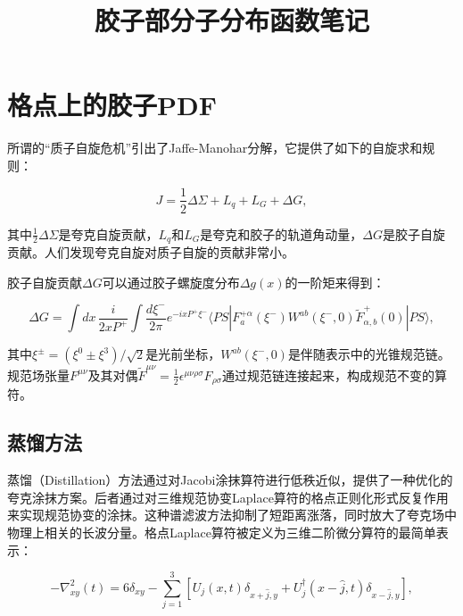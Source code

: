 \documentclass[12pt,a4paper]{ctexart}
\title{\heiti 胶子部分子分布函数笔记}
\author{}
\date{}
\theoremstyle{definition}
\begin{document}
\maketitle

\tableofcontents
\newpage

\section{格点上的胶子PDF}

所谓的``质子自旋危机''引出了Jaffe-Manohar分解\cite{Jaffe1990}，它提供了如下的自旋求和规则：

\begin{equation}
J = \frac{1}{2}\Delta\Sigma + L_q + L_G + \Delta G,
\label{eq:spin_sum}
\end{equation}

其中$\frac{1}{2}\Delta\Sigma$是夸克自旋贡献，$L_q$和$L_G$是夸克和胶子的轨道角动量，$\Delta G$是胶子自旋贡献。人们发现夸克自旋对质子自旋的贡献非常小。

胶子自旋贡献$\Delta G$可以通过胶子螺旋度分布$\Delta g(x)$的一阶矩来得到：

\begin{equation}
\Delta G = \int dx\, \frac{i}{2xP^+} \int \frac{d\xi^-}{2\pi} e^{-ixP^+\xi^-} \langle PS| F^{+\alpha}_a(\xi^-) W^{ab}(\xi^-, 0) \tilde{F}^+_{\alpha,b}(0) |PS\rangle,
\label{eq:DeltaG}
\end{equation}

其中$\xi^\pm = (\xi^0 \pm \xi^3)/\sqrt{2}$是光前坐标，$W^{ab}(\xi^-, 0)$是伴随表示中的光锥规范链。规范场张量$F^{\mu\nu}$及其对偶$\tilde{F}^{\mu\nu} = \frac{1}{2}\epsilon^{\mu\nu\rho\sigma}F_{\rho\sigma}$通过规范链连接起来，构成规范不变的算符。

\subsection{蒸馏方法}

蒸馏（Distillation）方法\cite{Peardon2009}通过对Jacobi涂抹算符\cite{Allton1993}进行低秩近似，提供了一种优化的夸克涂抹方案。后者通过对三维规范协变Laplace算符的格点正则化形式反复作用来实现规范协变的涂抹。这种谱滤波方法抑制了短距离涨落，同时放大了夸克场中物理上相关的长波分量。格点Laplace算符被定义为三维二阶微分算符的最简单表示：

\begin{equation}
-\nabla^2_{xy}(t) = 6\delta_{xy} - \sum_{j=1}^{3} \left[U_j(x,t)\delta_{x+\hat{j},y} + U^\dagger_j(x-\hat{j},t)\delta_{x-\hat{j},y}\right],
\label{eq:laplacian}
\end{equation}
\end{document}
